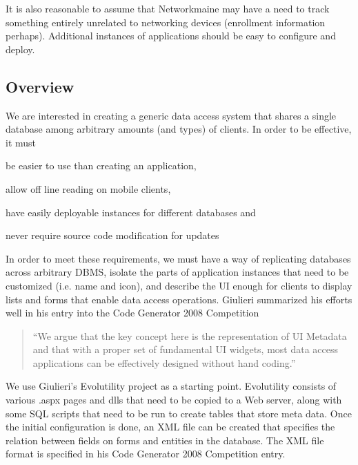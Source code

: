 It is also reasonable to assume that Networkmaine may have a need to track
something entirely unrelated to networking devices (enrollment information
perhaps). Additional instances of applications should be easy to configure
and deploy.


\subsection{Overview}  \label{sec:overview}







We are interested in creating a generic data access system that shares a single database among arbitrary amounts (and types) of clients. In order to be effective, it must 
\begin{inparaenum}
\item be easier to use than creating an application,
\item allow off line reading on mobile clients,
\item have easily deployable instances for different databases and
\item never require source code modification for updates
\end{inparaenum}
In order to meet these requirements, we must have a way of replicating databases
across arbitrary DBMS, isolate the parts of application instances that need to
be customized (i.e. name and icon), and describe the UI enough for clients to
display lists and forms that enable data access operations. Giulieri summarized his efforts well in his entry into the Code Generator 2008 Competition\cite{giulieri_minimalist_2011}
\begin{quotation}
``We argue that the key concept here is the representation of UI Metadata and
that with a proper set of fundamental UI widgets, most data access applications can be effectively designed without hand coding.''
\end{quotation}
We use Giulieri's Evolutility\cite{giulieri_evolutility_????} project as a starting point. Evolutility consists of various .aspx pages and dlls that need to be copied to a Web server, along with some SQL scripts that need to be run to create tables that store meta data. Once the initial configuration is done, an XML file can be created that specifies the relation between fields on forms and entities in the database. The XML file format is specified in his Code Generator 2008 Competition entry\cite{giulieri_minimalist_2011}. 

